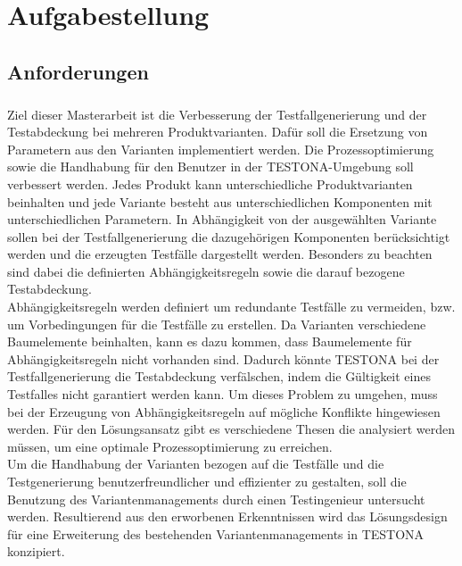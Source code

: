 
\chapter{Aufgabestellung}\label{chp:aufgabenstellung}

\section{Anforderungen}
\paragraph{}
Ziel dieser Masterarbeit ist die Verbesserung der Testfallgenerierung und der Testabdeckung bei mehreren Produktvarianten. Dafür soll die Ersetzung von Parametern aus den Varianten implementiert werden. Die Prozessoptimierung sowie die Handhabung für den Benutzer in der TESTONA-Umgebung soll verbessert werden. Jedes Produkt kann unterschiedliche Produktvarianten beinhalten und jede Variante besteht aus unterschiedlichen Komponenten mit unterschiedlichen Parametern. In Abhängigkeit von der ausgewählten Variante sollen bei der Testfallgenerierung die dazugehörigen Komponenten berücksichtigt werden und die erzeugten Testfälle dargestellt werden. Besonders zu beachten sind dabei die definierten Abhängigkeitsregeln sowie die darauf bezogene Testabdeckung.\\

Abhängigkeitsregeln werden definiert um redundante Testfälle zu vermeiden, bzw. um Vorbedingungen für die Testfälle zu erstellen. Da Varianten verschiedene Baumelemente beinhalten, kann es dazu kommen, dass Baumelemente für Abhängigkeitsregeln nicht vorhanden sind. Dadurch könnte TESTONA bei der Testfallgenerierung die Testabdeckung verfälschen, indem die Gültigkeit eines Testfalles nicht garantiert werden kann. Um dieses Problem zu umgehen, muss bei der Erzeugung von Abhängigkeitsregeln auf mögliche Konflikte hingewiesen werden. Für den Lösungsansatz gibt es verschiedene Thesen die analysiert werden müssen, um eine optimale Prozessoptimierung zu erreichen.\\

Um die Handhabung der Varianten bezogen auf die Testfälle und die Testgenerierung benutzerfreundlicher und effizienter zu gestalten, soll die Benutzung des Variantenmanagements durch einen Testingenieur untersucht werden. Resultierend aus den erworbenen Erkenntnissen wird das Lösungsdesign für eine Erweiterung des bestehenden Variantenmanagements in TESTONA konzipiert.\\

